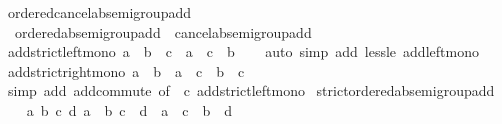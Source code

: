 \begin{isabellebody}
\isanewline
{}\isamarkupfalse%
\ ordered{\isacharunderscore}{\kern0pt}cancel{\isacharunderscore}{\kern0pt}ab{\isacharunderscore}{\kern0pt}semigroup{\isacharunderscore}{\kern0pt}add\ {\isacharequal}{\kern0pt}\isanewline
\ \ ordered{\isacharunderscore}{\kern0pt}ab{\isacharunderscore}{\kern0pt}semigroup{\isacharunderscore}{\kern0pt}add\ {\isacharplus}{\kern0pt}\ cancel{\isacharunderscore}{\kern0pt}ab{\isacharunderscore}{\kern0pt}semigroup{\isacharunderscore}{\kern0pt}add\isanewline
{}\isanewline
\isanewline
{}\isamarkupfalse%
\ add{\isacharunderscore}{\kern0pt}strict{\isacharunderscore}{\kern0pt}left{\isacharunderscore}{\kern0pt}mono{\isacharcolon}{\kern0pt}\ {\isachardoublequoteopen}a\ {\isacharless}{\kern0pt}\ b\ {\isasymLongrightarrow}\ c\ {\isacharplus}{\kern0pt}\ a\ {\isacharless}{\kern0pt}\ c\ {\isacharplus}{\kern0pt}\ b{\isachardoublequoteclose}\isanewline
%
\isadelimproof
\ \ %
\endisadelimproof
%
\isatagproof
{}\isamarkupfalse%
\ {\isacharparenleft}{\kern0pt}auto\ simp\ add{\isacharcolon}{\kern0pt}\ less{\isacharunderscore}{\kern0pt}le\ add{\isacharunderscore}{\kern0pt}left{\isacharunderscore}{\kern0pt}mono{\isacharparenright}{\kern0pt}%
\endisatagproof
{\isafoldproof}%
%
\isadelimproof
\isanewline
%
\endisadelimproof
\isanewline
{}\isamarkupfalse%
\ add{\isacharunderscore}{\kern0pt}strict{\isacharunderscore}{\kern0pt}right{\isacharunderscore}{\kern0pt}mono{\isacharcolon}{\kern0pt}\ {\isachardoublequoteopen}a\ {\isacharless}{\kern0pt}\ b\ {\isasymLongrightarrow}\ a\ {\isacharplus}{\kern0pt}\ c\ {\isacharless}{\kern0pt}\ b\ {\isacharplus}{\kern0pt}\ c{\isachardoublequoteclose}\isanewline
%
\isadelimproof
\ \ %
\endisadelimproof
%
\isatagproof
{}\isamarkupfalse%
\ {\isacharparenleft}{\kern0pt}simp\ add{\isacharcolon}{\kern0pt}\ add{\isachardot}{\kern0pt}commute\ {\isacharbrackleft}{\kern0pt}of\ {\isacharunderscore}{\kern0pt}\ c{\isacharbrackright}{\kern0pt}\ add{\isacharunderscore}{\kern0pt}strict{\isacharunderscore}{\kern0pt}left{\isacharunderscore}{\kern0pt}mono{\isacharparenright}{\kern0pt}%
\endisatagproof
{\isafoldproof}%
%
\isadelimproof
\isanewline
%
\endisadelimproof
\isanewline
{}\isamarkupfalse%
\ strict{\isacharunderscore}{\kern0pt}ordered{\isacharunderscore}{\kern0pt}ab{\isacharunderscore}{\kern0pt}semigroup{\isacharunderscore}{\kern0pt}add\isanewline
%
\isadelimproof
%
\endisadelimproof
%
\isatagproof
{}\isamarkupfalse%
\isanewline
\ \ \isamarkupfalse%
\ {\isachardoublequoteopen}{\isasymAnd}a\ b\ c\ d{\isachardot}{\kern0pt}\ {\isasymlbrakk}a\ {\isacharless}{\kern0pt}\ b{\isacharsemicolon}{\kern0pt}\ c\ {\isacharless}{\kern0pt}\ d{\isasymrbrakk}\ {\isasymLongrightarrow}\ a\ {\isacharplus}{\kern0pt}\ c\ {\isacharless}{\kern0pt}\ b\ {\isacharplus}{\kern0pt}\ d{\isachardoublequoteclose}\isanewline

\end{isabellebody}
